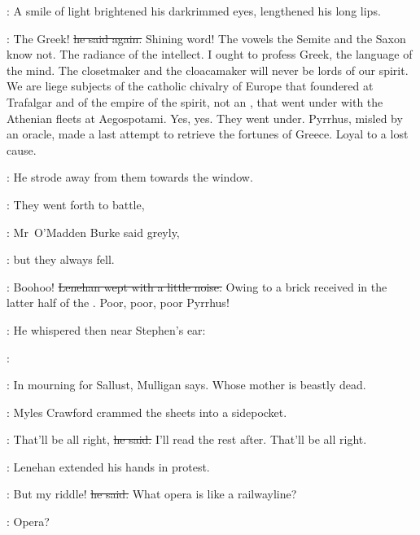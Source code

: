 
:
A smile of light brightened his darkrimmed eyes,
lengthened his long lips.

\machugh:
The Greek!
\sout{he said again.}
Shining word!
The vowels the Semite and the Saxon know not.
The radiance of the intellect.
I ought to profess Greek, the language of the mind.
The closetmaker and the cloacamaker will never be lords of our spirit.
We are liege subjects of the catholic chivalry of Europe that foundered at Trafalgar
and of the empire of the spirit,
not an ,
that went under with the Athenian fleets at Aegospotami.
Yes, yes.
They went under.
Pyrrhus,
misled by an oracle,
made a last attempt to retrieve the fortunes of Greece.
Loyal to a lost cause.

:
He strode away from them towards the window.

\omaddenburke:
They went forth to battle,

:
Mr~O'Madden Burke said greyly,

\omaddenburke:
but they always fell.

\lenehan:
Boohoo!
\sout{Lenehan wept with a little noise.}
Owing to a brick received in the latter half of the .
Poor, poor, poor Pyrrhus!

:
He whispered then near Stephen's ear:



\lenehan:


\StephenInt:
In mourning for Sallust,
Mulligan says.
Whose mother is beastly dead.

:
Myles Crawford crammed the sheets into a sidepocket.

\crawford:
That'll be all right,
\sout{he said.}
I'll read the rest after.
That'll be all right.

:
Lenehan extended his hands in protest.

\lenehan:
But my riddle!
\sout{he said.}
What opera is like a railwayline?

\omaddenburke:
Opera?

